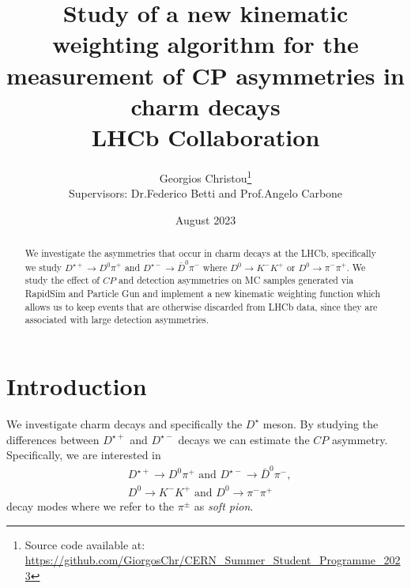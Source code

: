 \documentclass{article}
\title{\textbf{
        Study of a new kinematic weighting algorithm for the measurement of CP asymmetries in charm decays}
        \\
        LHCb Collaboration
}
\author{
        Georgios Christou\thanks{Source code available at: \url{https://github.com/GiorgosChr/CERN_Summer_Student_Programme_2023}}
        \\
        Supervisors: Dr.\@ Federico Betti and Prof.\@ Angelo Carbone
}
\date{
        August 2023
}
\begin{document}
        \begin{figure}[t]
                \centering
                \hypersetup{hidelinks} %
                \hspace{1cm}
        \end{figure}

        \maketitle
        \thispagestyle{empty}

        \begin{abstract}
                We investigate the asymmetries that occur in charm decays at the LHCb, specifically we study $D^{\star+}\to D^0\pi^+$ and $D^{\star-}\to \bar{D}^0\pi^-$ where $D^0\to K^-K^+$ or $D^0\to \pi^-\pi^+$.
                We study the effect of $CP$ and detection asymmetries on MC samples generated via RapidSim and Particle Gun and implement a new kinematic weighting function which allows us to keep events that are otherwise discarded from LHCb data, since they are associated with large detection asymmetries.
        \end{abstract}

        
        \pagebreak


        \section{Introduction}
        We investigate charm decays and specifically the $D^\star$ meson.
        By studying the differences between $D^{\star +}$ and $D^{\star -}$ decays we can estimate the $CP$ asymmetry.
        Specifically, we are interested in
        \begin{eqnarray}
                &D^{\star+}\to D^0\pi^+ \text{ and } D^{\star-}\to \bar{D}^0\pi^-, \nonumber\\
                &D^0 \to K^-K^+ \text{ and } D^0 \to \pi^-\pi^+
        \end{eqnarray}
        decay modes where we refer to the $\pi^\pm$ as \textit{soft pion}.
\end{document}
